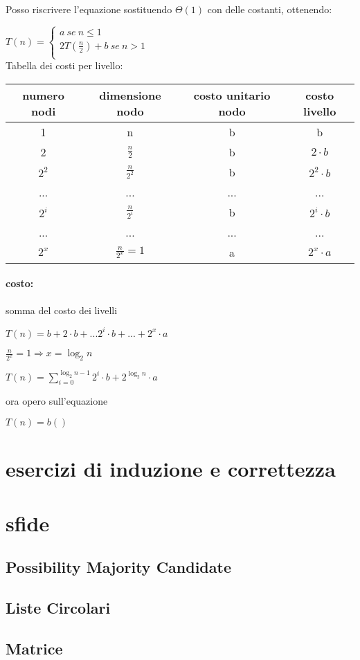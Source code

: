 \documentclass{article}
\begin{document}
Posso riscrivere l'equazione sostituendo $\Theta(1)$ con delle costanti, ottenendo:

$T(n)= \begin{cases}
    a \ se \ n \leq 1\\
    2T(\frac{n}{2}) + b \ se \ n > 1\\
\end{cases}$
\\
Tabella dei costi per livello:\\
\begin{tabular}{|c|c|c|c|}
    \hline
    numero nodi & dimensione nodo & costo unitario nodo & costo livello\\
    \hline
    1 & n & b & b\\
    2 & $\frac{n}{2}$ & b & $2 \cdot b$\\
    $2^2$ & $\frac{n}{2^2}$ & b & $2^2 \cdot b$\\
    ... & ... & ... & ...\\
    $2^i$ & $\frac{n}{2^i}$ & b & $2^i \cdot b$\\
    ... & ... & ... & ...\\
    $2^x$ & $\frac{n}{2^x}=1$ & a & $2^x \cdot a$\\
    \hline
\end{tabular}

\paragraph{costo:} somma del costo dei livelli 

$\displaystyle T(n) = b + 2 \cdot b + ... 2^i \cdot b + ... + 2^x \cdot a $

$\displaystyle \frac{n}{2^x} = 1 \Rightarrow x = \log_2 n$

$T(n) = \displaystyle \sum_{i=0}^{\log_2 n-1}2^i \cdot b + 2^{\log_2 n} \cdot a$

ora opero sull'equazione 


$T(n)= b ()$

\section{esercizi di induzione e correttezza}
\section{sfide}
\subsection{Possibility Majority Candidate}
\subsection{Liste Circolari}
\subsection{Matrice}
\end{document}
